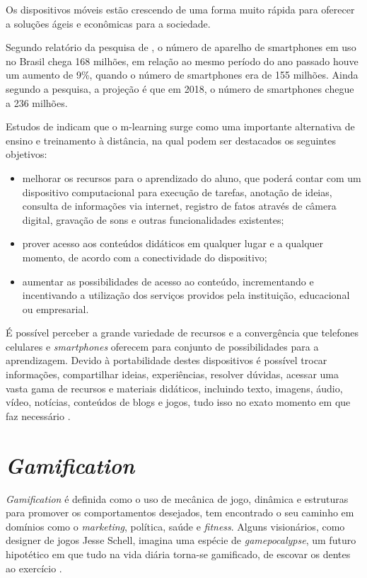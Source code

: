 \documentclass[
	12pt,				%
	openany,			%
	oneside,			%
	a4paper,			%
	english,			%
	french,				%
	spanish,			%
	brazil				%
	]{abntex2}
\begin{document}
Os dispositivos móveis estão crescendo de uma forma muito rápida para oferecer a soluções ágeis e econômicas para a sociedade.

Segundo relatório da pesquisa de , o número de aparelho de smartphones em uso no Brasil chega 168 milhões, em relação ao mesmo período do ano passado houve um aumento de 9\%, quando o número de smartphones era de 155 milhões.  Ainda segundo a pesquisa, a projeção é que em 2018, o número de smartphones chegue a 236 milhões.

Estudos de  indicam que o m-learning surge como uma importante alternativa de ensino e treinamento à distância, na qual podem ser destacados os seguintes objetivos:
\begin{itemize}
\item melhorar os recursos para o aprendizado do aluno, que poderá contar com um dispositivo computacional para execução de tarefas, anotação de ideias, consulta de informações via internet, registro de fatos através de câmera digital, gravação de sons e outras funcionalidades existentes;
\item prover acesso aos conteúdos didáticos em qualquer lugar e a qualquer momento, de acordo com a conectividade do dispositivo;
\item aumentar as possibilidades de acesso ao conteúdo, incrementando e incentivando a utilização dos serviços providos pela instituição, educacional ou empresarial.
\end{itemize}

É possível perceber a grande variedade de recursos e a convergência que telefones celulares e \textit{smartphones} oferecem para conjunto de possibilidades para a aprendizagem. Devido à portabilidade destes dispositivos é possível trocar informações, compartilhar ideias, experiências, resolver dúvidas, acessar uma vasta gama de recursos e materiais didáticos, incluindo texto, imagens, áudio, vídeo, notícias, conteúdos de blogs e jogos, tudo isso no exato momento em que faz necessário \cite{FERREIRA}.


\section  {\itshape Gamification}

\textit{Gamification} é definida como o uso de mecânica de jogo, dinâmica e estruturas para promover os comportamentos desejados, tem encontrado o seu caminho em domínios como o \textit{marketing}, política, saúde e \textit{fitness}. Alguns visionários, como designer de jogos Jesse Schell, imagina uma espécie de \textit{gamepocalypse}, um futuro hipotético em que tudo na vida diária torna-se gamificado, de escovar os dentes ao exercício \cite{SCHELL}.
\end{document}
